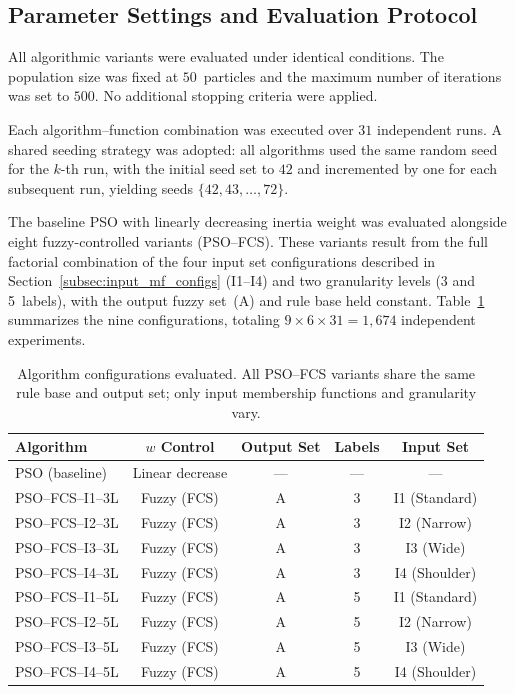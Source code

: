 \documentclass[conference]{IEEEtran}
\begin{document}
\subsection{Parameter Settings and Evaluation Protocol}
\label{subsec:protocol}

All algorithmic variants were evaluated under identical conditions. The population size was fixed at $50$~particles and the maximum number of iterations was set to $500$. No additional stopping criteria were applied.

Each algorithm--function combination was executed over $31$ independent runs. A shared seeding strategy was adopted: all algorithms used the same random seed for the $k$-th run, with the initial seed set to $42$ and incremented by one for each subsequent run, yielding seeds $\{42, 43, \ldots, 72\}$.

The baseline PSO with linearly decreasing inertia weight was evaluated alongside eight fuzzy-controlled variants (PSO--FCS). These variants result from the full factorial combination of the four input set configurations described in Section~\ref{subsec:input_mf_configs} (I1--I4) and two granularity levels (3 and 5~labels), with the output fuzzy set~(A) and rule base held constant. Table~\ref{tab:algorithm_configs} summarizes the nine configurations, totaling $9 \times 6 \times 31 = 1{,}674$ independent experiments.

\begin{table}[!ht]
    \caption{Algorithm configurations evaluated. All PSO--FCS variants share the same rule base and output set; only input membership functions and granularity vary.}
    \label{tab:algorithm_configs}
    \centering
    \begin{tabular}{lcccc}
    \toprule
    Algorithm & $w$ Control & Output Set & Labels & Input Set \\
    \midrule
    PSO (baseline)   & Linear decrease & --- & --- & --- \\
    PSO--FCS--I1--3L & Fuzzy (FCS) & A & 3 & I1 (Standard) \\
    PSO--FCS--I2--3L & Fuzzy (FCS) & A & 3 & I2 (Narrow) \\
    PSO--FCS--I3--3L & Fuzzy (FCS) & A & 3 & I3 (Wide) \\
    PSO--FCS--I4--3L & Fuzzy (FCS) & A & 3 & I4 (Shoulder) \\
    PSO--FCS--I1--5L & Fuzzy (FCS) & A & 5 & I1 (Standard) \\
    PSO--FCS--I2--5L & Fuzzy (FCS) & A & 5 & I2 (Narrow) \\
    PSO--FCS--I3--5L & Fuzzy (FCS) & A & 5 & I3 (Wide) \\
    PSO--FCS--I4--5L & Fuzzy (FCS) & A & 5 & I4 (Shoulder) \\
    \bottomrule
    \end{tabular}
\end{table}
\end{document}
